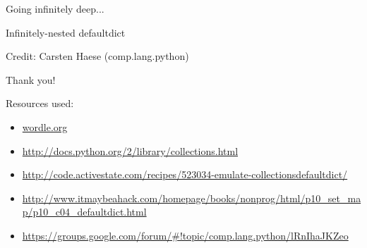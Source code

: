 \documentclass{beamer}
\begin{document}
\begin{frame}{Going infinitely deep...}

Infinitely-nested defaultdict

\usebox{\mysavebox}

\bigskip
Credit: Carsten Haese (comp.lang.python)

\end{frame}

\begin{frame}{Thank you!}

Resources used:
\begin{itemize}
  \item \url{wordle.org}
  \item \url{http://docs.python.org/2/library/collections.html}
  \item \url{http://code.activestate.com/recipes/523034-emulate-collectionsdefaultdict/}
  \item \url{http://www.itmaybeahack.com/homepage/books/nonprog/html/p10_set_map/p10_c04_defaultdict.html}
  \item \url{https://groups.google.com/forum/\#!topic/comp.lang.python/lRnIhaJKZeo}
\end{itemize}

\end{frame}
\end{document}
